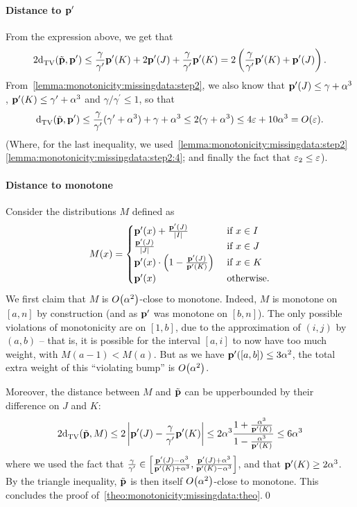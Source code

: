 \paragraph{Distance to $\mathbf{p}^\prime$} From the expression above, we get that
\[
2{\operatorname{d}_{\textrm{TV}}^{}\!\left({\tilde{\mathbf{p}}, \mathbf{p}^\prime}\right)} \leq \frac{\gamma}{\gamma^\prime} \mathbf{p}^\prime(K) +  2\mathbf{p}^\prime(J) + \frac{\gamma}{\gamma^\prime} \mathbf{p}^\prime(K) = 2\left(\frac{\gamma}{\gamma^\prime} \mathbf{p}^\prime(K) + \mathbf{p}^\prime(J) \right).
\] 
From~\cref{lemma:monotonicity:missingdata:step2}, we also know that $\mathbf{p}^\prime(J) \leq \gamma+\alpha^3$, $\mathbf{p}^\prime(K) \leq \gamma^\prime+\alpha^3$ and $\gamma/\gamma^\prime \leq 1$, so that
\[
\totalvardist{\tilde{\D}}{\D^\prime} \leq \frac{\gamma}{\gamma^\prime} (\gamma^\prime+\alpha^3) + \gamma+\alpha^3 \leq 2(\gamma+\alpha^3) \leq 4\eps+10\alpha^3 = \bigO{\eps}.
\] 
(Where, for the last inequality, we used~\cref{lemma:monotonicity:missingdata:step2} \ref{lemma:monotonicity:missingdata:step2:4}; and finally the fact that $\varepsilon_2\leq \varepsilon$).

\paragraph{Distance to monotone}

Consider the distributions $M$ defined as
\[
M(x) = \begin{cases}
 \mathbf{p}^\prime(x) + \frac{\mathbf{p}^\prime(J)}{\left\lvert I \right\rvert} & \text{ if } x\in I \\
 \frac{\mathbf{p}^\prime(J)}{\left\lvert J \right\rvert} & \text{ if } x\in J \\
 \mathbf{p}^\prime(x)\cdot\left(1-\frac{\mathbf{p}^\prime(J)}{\mathbf{p}^\prime(K)}\right) & \text{ if } x\in K \\
 \mathbf{p}^\prime(x) & \text{ otherwise.}
\end{cases}
\]
We first claim that $M$ is $\bigO{\alpha^2}$-close to monotone. Indeed, $M$ is monotone on $[a,n]$ by construction (and as $\mathbf{p}^\prime$ was monotone on $[b,n]$). The only possible violations of monotonicity are on $[1,b]$, due to the approximation of $(i,j)$ by $(a,b)$ -- that is, it is possible for the interval $[a,i]$ to now have too much weight, with $M(a-1) < M(a)$. But as we have $\mathbf{p}^\prime([a,b])\leq 3\alpha^2$, the total extra weight of this ``violating bump'' is $\bigO{\alpha^2}$.\medskip

Moreover, the distance between $M$ and $\tilde{\mathbf{p}}$ can be upperbounded by their difference on $J$ and $K$:
\begin{align*}
  2{\operatorname{d}_{\textrm{TV}}^{}\!\left({\tilde{\mathbf{p}}, M}\right)} \leq 2\left\lvert  \mathbf{p}^\prime(J) - \frac{\gamma}{\gamma^\prime} \mathbf{p}^\prime(K)  \right\rvert \leq 2\alpha^3\frac{1+\frac{\alpha^3}{\mathbf{p}^\prime(K)}}{1-\frac{\alpha^3}{\mathbf{p}^\prime(K)}} \leq 6\alpha^3
\end{align*}
where we used the fact that $\frac{\gamma}{\gamma^\prime} \in \left[\frac{\mathbf{p}^\prime(J)-\alpha^3}{\mathbf{p}^\prime(K) + \alpha^3}, \frac{\mathbf{p}^\prime(J)+\alpha^3}{\mathbf{p}^\prime(K) - \alpha^3}\right]$, and that $\mathbf{p}^\prime(K) \geq 2\alpha^3$. By the triangle inequality, $\tilde{\mathbf{p}}$ is then itself $\bigO{\alpha^2}$-close to monotone. This concludes the proof of~\cref{theo:monotonicity:missingdata:theo}.\qed
